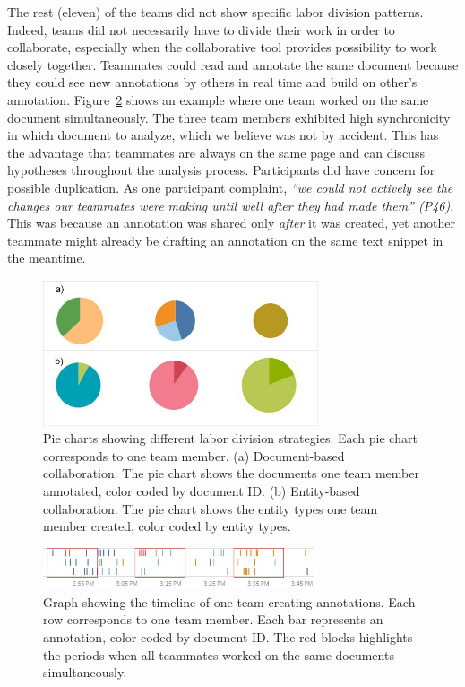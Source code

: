 The rest (eleven) of the teams did not show specific labor division
patterns. Indeed, teams did not necessarily have to divide their work in
order to collaborate, especially when the collaborative tool provides
possibility to work closely together. Teammates could read and annotate
the same document because they could see new annotations by others in
real time and build on other's annotation. Figure~\ref{fig:close_collaboration} 
shows an example where one team worked on the same document simultaneously. 
The three team members exhibited high synchronicity in which document to
analyze, which we believe was not by accident. This has the advantage that
teammates are always on the same page and can discuss hypotheses
throughout the analysis process. Participants did have concern for
possible duplication. As one participant complaint, \emph{``we could not
actively see the changes our teammates were making until well after they
had made them'' (P46)}. This was because an annotation was shared only
\emph{after} it was created, yet another teammate might already be drafting an
annotation on the same text snippet in the meantime.

\begin{figure}
\centering
\includegraphics[width=3.20000in]{img/labor_division.jpg}
\caption{Pie charts showing different labor division strategies. Each
pie chart corresponds to one team member. (a) Document-based
collaboration. The pie chart shows the documents one team member
annotated, color coded by document ID. (b) Entity-based collaboration.
The pie chart shows the entity types one team member created, color
coded by entity types.\label{fig:labor_division}}
\end{figure}

\begin{figure}
\centering
\includegraphics[width=3.20000in]{img/close_collaboration.jpg}
\caption{Graph showing the timeline of one team creating annotations.
Each row corresponds to one team member. Each bar represents an
annotation, color coded by document ID. The red blocks highlights the
periods when all teammates worked on the same documents
simultaneously.\label{fig:close_collaboration}}
\end{figure}

